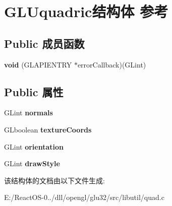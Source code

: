 \hypertarget{struct_g_l_uquadric}{}\section{G\+L\+Uquadric结构体 参考}
\label{struct_g_l_uquadric}
\subsection*{Public 成员函数}
\begin{DoxyCompactItemize}
\item 
\mbox{\label{struct_g_l_uquadric_a1a15e399b10085786f10412de22769fa}} 
{\bfseries void} (G\+L\+A\+P\+I\+E\+N\+T\+RY $\ast$error\+Callback)(G\+Lint)
\end{DoxyCompactItemize}
\subsection*{Public 属性}
\begin{DoxyCompactItemize}
\item 
\mbox{\label{struct_g_l_uquadric_abd608bed6b5e0e77aa4fd0a1c5764197}} 
G\+Lint {\bfseries normals}
\item 
\mbox{\label{struct_g_l_uquadric_afbe7f3c16bc22e3bab9c8495a19cd310}} 
G\+Lboolean {\bfseries texture\+Coords}
\item 
\mbox{\label{struct_g_l_uquadric_a16504467f8c3a5151e083c5528aa6b8e}} 
G\+Lint {\bfseries orientation}
\item 
\mbox{\label{struct_g_l_uquadric_a721f62945aa2283b65890c8317ad04ab}} 
G\+Lint {\bfseries draw\+Style}
\end{DoxyCompactItemize}


该结构体的文档由以下文件生成\+:\begin{DoxyCompactItemize}
\item 
E\+:/\+React\+O\+S-\/0../dll/opengl/glu32/src/libutil/quad.\+c\end{DoxyCompactItemize}
